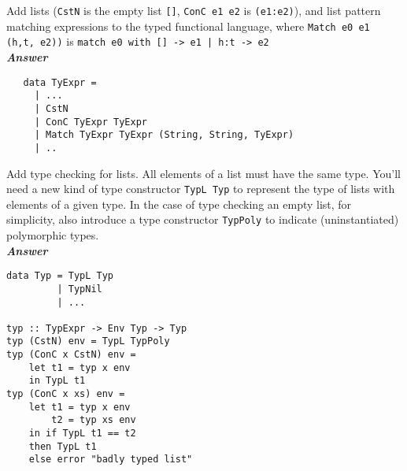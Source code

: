 \documentclass[a4paper]{article}
\begin{document}
\begin{exercise}
  Add lists (\texttt{CstN} is the empty list \texttt{[]},
  \texttt{ConC e1 e2} is \texttt{(e1:e2)}), and list pattern matching
  expressions to the typed functional language, where
  \texttt{Match e0 e1 (h,t, e2))} is \texttt{match e0 with [] -> e1
    | h:t -> e2}\\

\noindent
\textbf{\emph{Answer}} 
{\codesetup\begin{verbatim}
   data TyExpr = 
     | ...
     | CstN
     | ConC TyExpr TyExpr
     | Match TyExpr TyExpr (String, String, TyExpr)
     | ..
\end{verbatim}}

\end{exercise}

\begin{exercise}
  Add type checking for lists.  All elements of a list must have the
  same type.  You'll need a new kind of type constructor \texttt{TypL Typ} to
  represent the type of lists with elements of a given type. In the case of type checking an empty list, for simplicity, also introduce a type constructor \texttt{TypPoly} to indicate (uninstantiated) polymorphic types.\\
  
\noindent
\textbf{\emph{Answer}} 
{\codesetup\begin{verbatim}
data Typ = TypL Typ
         | TypNil
         | ...
         
typ :: TypExpr -> Env Typ -> Typ
typ (CstN) env = TypL TypPoly
typ (ConC x CstN) env = 
    let t1 = typ x env
    in TypL t1
typ (ConC x xs) env = 
    let t1 = typ x env
        t2 = typ xs env
    in if TypL t1 == t2
    then TypL t1
    else error "badly typed list"
\end{verbatim}}
\end{exercise}
\end{document}
